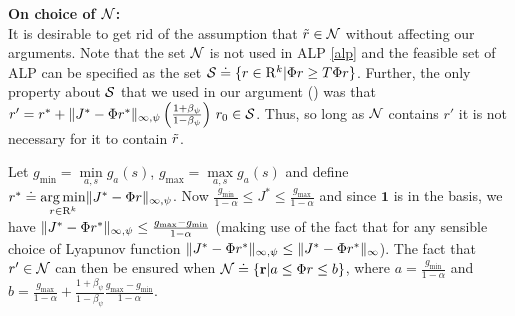 \begin{appendix}
\textbf{On choice of $\N$:}\\
It is desirable to get rid of the assumption that $\tr\in \N$ without affecting our arguments. Note that the set $\N$ is not used in ALP \eqref{alp} and the feasible set of ALP can be specified as the set $\S\eqdef\{r\in \R^k| \Phi r \geq T\Phi r\}$. Further, the only property about $\S$ that we used in our argument () was that $r'= r^*+\norm{J^*-\Phi r^*}_{\mn} \left(\frac{1+\beta_{\psi}}{1-\beta_{\psi}}\right)\, r_0 \in \S$. Thus, so long as $\N$ contains $r'$ it is not necessary for it to contain $\tr$.\par
Let $g_{\min}=\underset{a,s}{\min}g_a(s)$, $g_{\max}=\underset{a,s}{\max}g_a(s)$ and define $r^*\eqdef\underset{r\in \R^k}{\arg\min}\norm{J^*-\Phi r}_{\mn}$. Now $\frac{g_{\min}}{1-\alpha}\leq J^* \leq \frac{g_{\max}}{1-\alpha}$ and since $\mathbf{1}$ is in the basis, we have $\norm{J^*-\Phi r^*}_{\mn}\leq \frac{g_{\max}-g_{\min}}{1-\alpha}$ (making use of the fact that for any sensible choice of Lyapunov function $\norm{J^*-\Phi r^*}_{\mn}\leq \norm{J^*-\Phi r^*}_{\infty}$).  The fact that $r'\in \N$ can then be ensured when $\N\eqdef\{\r| a\leq \Phi r\leq b\}$, where $a=\frac{g_{\min}}{1-\alpha}$ and $b=\frac{g_{\max}}{1-\alpha}+\frac{1+\beta_{\psi}}{1-\beta_{\psi}}\frac{g_{\max}-g_{\min}}{1-\alpha}$.
\end{appendix}
